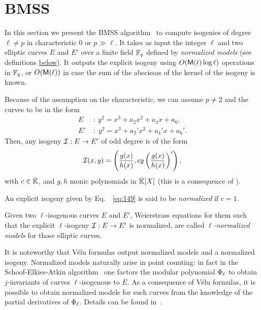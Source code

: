 

\section{BMSS}
\label{sec:bmss}
In this section we present the BMSS
algorithm~\cite{bostan+morain+salvy+schost08} to compute isogenies of
degree $\ell\ne p$ in characteristic $0$ or $p\gg\ell$. It takes as
input the integer $\ell$ and two elliptic curves $E$ and $E'$ over a
finite field $\mathbb{F}_q$ defined by \emph{normalized models} (see
definitions \hyperref[def:canon-isog]{below}). It outputs the explicit
isogeny using $O(\mathsf{M}(\ell)\log\ell)$ operations in $\mathbb{F}_q$, or
$O(\mathsf{M}(\ell))$ in case the sum of the abscissas of the kernel of the
isogeny is known.

  Because of the assumption on
the characteristic, we can assume $p\ne 2$ and the curves to be in
the form
\begin{equation}
  \label{eq:140}
  \begin{aligned}
    E \;&:\: y^2 = x^3 + a_2x^2 + a_4x + a_6\text{,}\\
    E'\;&:\; y^2 = x^3 + a_2'x^2 + a_4'x + a_6'\text{.}
  \end{aligned}
\end{equation}
Then, any isogeny $\mathcal{I}:E\rightarrow E'$ of odd degree is of the form
\begin{equation}
  \label{eq:149}
  \mathcal{I}(x,y) = \left(\frac{g(x)}{h(x)},cy\left(\frac{g(x)}{h(x)}\right)'\right)
  \text{,}
\end{equation}
with $c\in\bar{\mathbb{K}}$, and $g,h$ monic polynomials in $\bar{\mathbb{K}}[X]$
(this is a consequence of ).

\begin{definition}
  \label{def:canon-isog}
  An explicit isogeny given by Eq.\ifafive\ \else~\fi\eqref{eq:149} is said to be
  \emph{normalized}
  if $c=1$. 

  Given two $\ell$-isogenous curves $E$ and $E'$, Weierstrass
  equations for them such that the explicit $\ell$-isogeny
  $\mathcal{I}:E\rightarrow E'$ is normalized, are called
  \emph{$\ell$-normalized models} for those
  elliptic curves.
\end{definition}

 It is noteworthy that Vélu formulas output normalized
models and a normalized isogeny. Normalized models naturally arise in
point counting: in fact in the Schoof-Elkies-Atkin
algorithm~\cite{atkin88,elkies98,schoof95} one factors the modular
polynomial $\Phi_\ell$ to obtain $j$-invariants of curves
$\ell$-isogenous to $E$. As a consequence of Vélu formulas, it is
possible to obtain normalized models for such curves from the
knowledge of the partial derivatives of $\Phi_\ell$.  Details can
be found in~\cite{schoof95,morain95,elkies98,lercier-algorithmique}.

